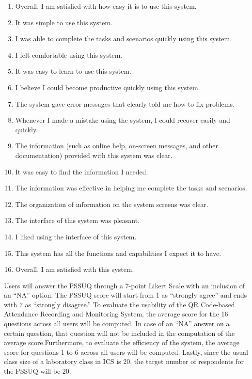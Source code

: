 \documentclass[journal]{./IEEE/IEEEtran}
\begin{document}
\begin{enumerate}
    \item Overall, I am satisfied with how easy it is to use this system.
    \item It was simple to use this system.
    \item I was able to complete the tasks and scenarios quickly using this system.
    \item I felt comfortable using this system.
    \item It was easy to learn to use this system.
    \item I believe I could become productive quickly using this system.
    \item The system gave error messages that clearly told me how to fix problems.
    \item Whenever I made a mistake using the system, I could recover easily and quickly.
    \item The information (such as online help, on-screen messages, and other documentation) provided with this system was clear.
    \item It was easy to find the information I needed.
    \item The information was effective in helping me complete the tasks and scenarios.
    \item The organization of information on the system screens was clear.
    \item The interface of this system was pleasant.
    \item I liked using the interface of this system.
    \item This system has all the functions and capabilities I expect it to have.
    \item Overall, I am satisfied with this system.
    \newline
\end{enumerate}
Users will answer the PSSUQ through a 7-point Likert Scale with an inclusion of an “NA” option. The PSSUQ score will start from 1 as “strongly agree” and ends with 7 as “strongly disagree.” To evaluate the usability of the QR Code-based Attendance Recording and Monitoring System, the average score for the 16 questions across all users will be computed. In case of an “NA” answer on a certain question, that question will not be included in the computation of the average score.Furthermore, to evaluate the efficiency of the system, the average score for questions 1 to 6 across all users will be computed. Lastly, since the usual class size of a laboratory class in ICS is 20, the target number of respondents for the PSSUQ will be 20. 
\end{document}
